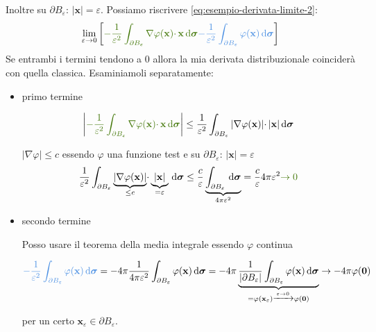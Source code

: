 \documentclass[10pt,a4paper,twoside,openright]{book}
\newcommand{\x}{\mathbf{x}}
\newcommand{\zer}{\mathbf{0}}
\newcommand{\sigg}{\bm{\sigma}}
\newcommand{\de}{\,\mathrm d}
\newcommand{\dsig}{\de \sigg}
\begin{document}
Inoltre su $\displaystyle \partial B_{\varepsilon }$: $\displaystyle | \x| =\varepsilon $. Possiamo riscrivere \eqref{eq:esempio-derivata-limite-2}:
\begin{equation*}
	\lim _{\varepsilon \rightarrow 0}\left[\textcolor[rgb]{0.25,0.46,0.02}{-\frac{1}{\varepsilon ^{2}}\int _{\partial B_{\varepsilon }} \nabla \varphi (\x) \cdotp \x \dsig }\textcolor[rgb]{0.29,0.56,0.89}{-\frac{1}{\varepsilon ^{2}}\int _{\partial B_{\varepsilon }} \varphi (\x) \dsig }\right]
\end{equation*}
Se entrambi i termini tendono a $0$ allora la mia derivata distribuzionale coinciderà con quella classica. Esaminiamoli separatamente:
\begin{itemize}
	\item primo termine
	      
	      \begin{equation*}
	      	\left| \textcolor[rgb]{0.25,0.46,0.02}{-\frac{1}{\varepsilon ^{2}}\int _{\partial B_{\varepsilon }} \nabla \varphi (\x) \cdotp \x \dsig }\right| \leqslant \frac{1}{\varepsilon ^{2}}\int _{\partial B_{\varepsilon }}| \nabla \varphi (\x)| \cdotp | \x| \dsig 
	      \end{equation*}
	      
	      $\displaystyle | \nabla \varphi | \leqslant c$ essendo $\displaystyle \varphi $ una funzione test e su $\displaystyle \partial B_{\varepsilon }$: $\displaystyle | \x| =\varepsilon $
	      \begin{equation*}
	      \frac{1}{\varepsilon ^{2}}\int _{\partial B_{\varepsilon }}\underbrace{| \nabla \varphi (\x)| }_{\leqslant c} \cdotp \underbrace{| \x| }_{=\varepsilon } \dsig \leqslant \frac{c}{\varepsilon }\underbrace{\int _{\partial B_{\varepsilon }} \dsig }_{4\pi \varepsilon ^{2}} =\frac{c}{\varepsilon } 4\pi \varepsilon ^{2}\textcolor[rgb]{0.25,0.46,0.02}{\rightarrow 0}
	\end{equation*}
	\item secondo termine
	      
	      Posso usare il teorema della media integrale essendo $\displaystyle \varphi $ continua
	      
	      \begin{equation*}
	      	\textcolor[rgb]{0.29,0.56,0.89}{-\frac{1}{\varepsilon ^{2}}\int _{\partial B_{\varepsilon }} \varphi (\x) \dsig } =-4\pi \frac{1}{4\pi \varepsilon ^{2}}\int _{\partial B_{\varepsilon }} \varphi (\x) \dsig =-4\pi \underbrace{\frac{1}{| \partial B_{\varepsilon }| }\int _{\partial B_{\varepsilon }} \varphi (\x) \dsig }_{=\varphi (\x_{\varepsilon })\xrightarrow{\varepsilon \rightarrow 0} \varphi (\zer)}\rightarrow -4\pi \varphi (\zer)
	      \end{equation*}
	      
	      per un certo $\displaystyle \x_{\varepsilon } \in \partial B_{\varepsilon }$.
\end{itemize}
\end{document}
